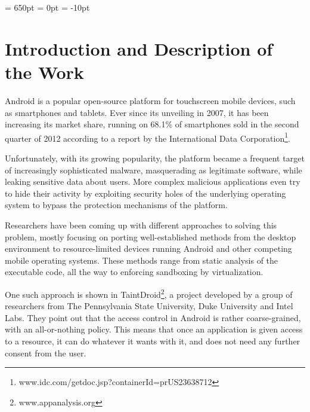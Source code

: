 \documentclass[12pt]{article}
\begin{document}
\thispagestyle{empty}
\textheight = 650pt
\topmargin = 0pt
\voffset = -10pt

%

\section*{Introduction and Description of the Work}

Android is a popular open-source platform for touchscreen
mobile devices, such as smartphones and tablets. Ever since its unveiling 
in 2007, it has been increasing its market share, running on 68.1\% of 
smartphones sold in the second quarter of 2012 according to a report by 
the International Data Corporation\footnote
{www.idc.com/getdoc.jsp?containerId=prUS23638712}.

Unfortunately, with its growing popularity, the platform became a frequent
target of increasingly sophisticated malware, masquerading as legitimate
software, while leaking sensitive data about users. More complex
malicious applications even try to hide their activity by exploiting 
security holes of the underlying operating system to bypass the 
protection mechanisms of the platform.

Researchers have been coming up with different approaches to solving
this problem, mostly focusing on porting well-established methods from
the desktop environment to resource-limited devices running Android and
other competing mobile operating systems. These methods range from 
static analysis of the executable code, all the way to enforcing sandboxing 
by virtualization. 

One such approach is shown in TaintDroid\footnote{www.appanalysis.org}, 
a project developed by a group of researchers from The Pennsylvania State
University, Duke University and Intel Labs. They point out that the
access control in Android is rather coarse-grained, with an all-or-nothing
policy. This means that once an application is given access to a resource,
it can do whatever it wants with it, and does not need any further consent 
from the user.
\end{document}
